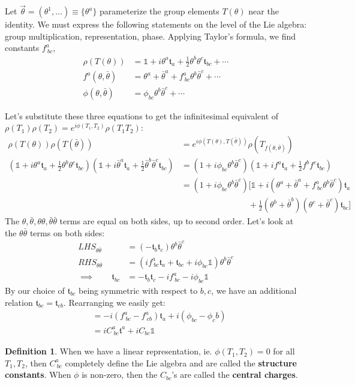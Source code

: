 \documentclass[10pt]{article}
\newcommand{\iden}{\mathds{1}}
\newcommand{\mf}{\mathfrak}
\newcommand{\FR}[2]{\frac{#1}{#2}}
\theoremstyle{plain}
\theoremstyle{definition}
\newtheorem{defn}{Definition}
\theoremstyle{remark}
\begin{document}
Let $\vec\theta = (\theta^1,\dots) \equiv \{\theta^a\}$ parameterize
the group elements $T(\theta)$ near the identity. We must express the
following statements on the level of the Lie algebra: group
multiplication, representation, phase.
%
Applying Taylor's formula, we find constants $f^a_{\ bc}$,
%
\begin{align}
\rho (T(\theta))        &= \iden + i\theta^a\mf t_a + \FR{1}{2}\theta^b\theta^c\mf t_{bc} + \cdots\\
f^a(\theta,\bar\theta)  &= \theta^a + \bar\theta^a + f^a_{\ bc}\theta^b\bar\theta^c + \cdots\\
\phi(\theta,\bar\theta) &= \phi_{bc}\theta^b\bar\theta^c + \cdots
\label{}
\end{align}

Let's substitute these three equations to get the infinitesimal
equivalent of $\rho(T_1)\rho(T_2) = e^{i\phi(T_1,T_2)}\rho(T_1T_2)$:
\begin{align}
\rho(T(\theta))\rho(T(\bar\theta)) &=
e^{i\phi(T(\theta),T(\bar\theta))}\rho(T_{f(\theta,\bar\theta)})\\
%
(\iden + i\theta^a\mf t_a + \FR{1}{2}\theta^b\theta^c\mf t_{bc})
(\iden + i\bar\theta^a\mf t_a + \FR{1}{2}\bar\theta^b\bar\theta^c\mf t_{bc})
&=
(1 + i\phi_{bc}\theta^b\bar\theta^c)
(\iden + if^a\mf t_a + \FR{1}{2}f^b f^c\mf t_{bc})\\
&=
(1 + i\phi_{bc}\theta^b\bar\theta^c)
\biggl[\iden + i(\theta^a+\bar\theta^a+f^{a}_{\ bc}\theta^b\bar\theta^c)\mf t_a\\
&\qquad\qquad\qquad\qquad
+\FR{1}{2}(\theta^b+\bar\theta^b) (\theta^c+\bar\theta^c)\mf t_{bc}\biggr]
\end{align}
The $\theta,\bar\theta,\theta\theta,\bar\theta\bar\theta$ terms are
equal on both sides, up to second order. Let's look at the
$\theta\bar\theta$ terms on both sides:
\begin{align}
    LHS_{\theta\bar\theta} &= (-\mf t_b\mf t_c)\theta^b\bar\theta^c\\
    RHS_{\theta\bar\theta} &= (if^{a}_{\ bc}\mf t_a + \mf t_{bc} + i\phi_{bc}\iden )\theta^b\bar\theta^c\\
    \implies\qquad
    \mf t_{bc} &= -\mf t_b\mf t_c - if^{a}_{\ bc} - i\phi_{bc}\iden
\end{align}
By our choice of $\mf t_{bc}$ being symmetric with respect to $b,c$,
we have an additional relation $\mf t_{bc} = \mf t_{cb}$. Rearranging
we easily get:
\begin{align}
    [\mf t_b,\mf t_c] &= -i(f^a_{\ bc} - f^a_{\ cb})\mf t_a + i(\phi_{bc}-\phi_cb)\\
    &= iC^{a}_{\ bc}\mf t^a + iC_{bc}\iden
\end{align}
\begin{defn} When we have a linear representation, ie. $\phi(T_1,T_2)
    = 0$ for all $T_1,T_2$, then $C^{a}_{\ bc}$ completely define the
    Lie algebra and are called the \textbf{structure constants}.
    When $\phi$ is non-zero, then the $C_{bc}$'s are called the
    \textbf{central charges}.
\end{defn}
\end{document}
